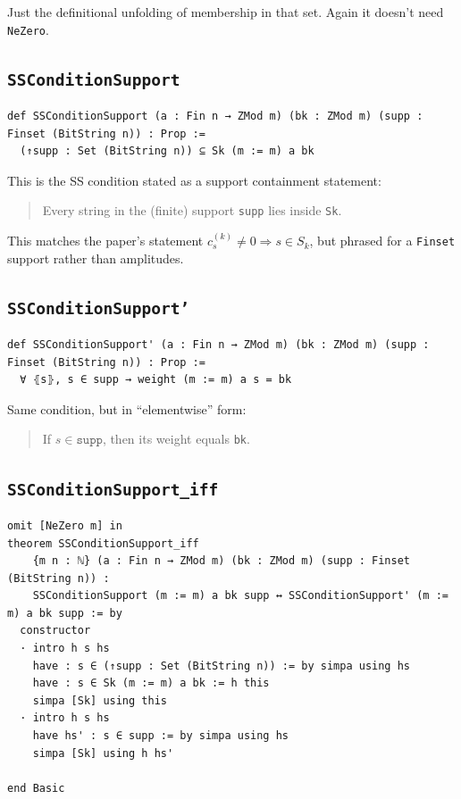 \documentclass[11pt]{article}
\begin{document}
Just the definitional unfolding of membership in that set. Again it doesn't need \texttt{NeZero}.

\subsection*{\texttt{SSConditionSupport}}

\begin{lstlisting}
def SSConditionSupport (a : Fin n → ZMod m) (bk : ZMod m) (supp : Finset (BitString n)) : Prop :=
  (↑supp : Set (BitString n)) ⊆ Sk (m := m) a bk
\end{lstlisting}

This is the SS condition stated as a support containment statement:

\begin{quote}
Every string in the (finite) support \texttt{supp} lies inside \texttt{Sk}.
\end{quote}

This matches the paper's statement $c^{(k)}_s\neq 0 \Rightarrow s\in S_k$,
but phrased for a \texttt{Finset} support rather than amplitudes.

\subsection*{\texttt{SSConditionSupport'}}

\begin{lstlisting}
def SSConditionSupport' (a : Fin n → ZMod m) (bk : ZMod m) (supp : Finset (BitString n)) : Prop :=
  ∀ ⦃s⦄, s ∈ supp → weight (m := m) a s = bk
\end{lstlisting}

Same condition, but in ``elementwise'' form:

\begin{quote}
If $s\in\texttt{supp}$, then its weight equals \texttt{bk}.
\end{quote}

\subsection*{\texttt{SSConditionSupport\_iff}}

\begin{lstlisting}
omit [NeZero m] in
theorem SSConditionSupport_iff
    {m n : ℕ} (a : Fin n → ZMod m) (bk : ZMod m) (supp : Finset (BitString n)) :
    SSConditionSupport (m := m) a bk supp ↔ SSConditionSupport' (m := m) a bk supp := by
  constructor
  · intro h s hs
    have : s ∈ (↑supp : Set (BitString n)) := by simpa using hs
    have : s ∈ Sk (m := m) a bk := h this
    simpa [Sk] using this
  · intro h s hs
    have hs' : s ∈ supp := by simpa using hs
    simpa [Sk] using h hs'

end Basic
\end{lstlisting}
\end{document}
